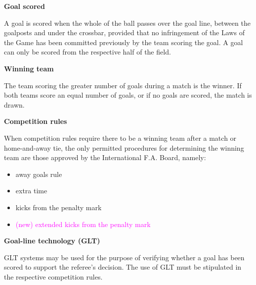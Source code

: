 \clearpage
\sffamily
{\bfseries\color[rgb]{0.4,0.4,0.4}{Law 10 -- The Method of Scoring} }
{}

\bigskip

{\bfseries Goal scored }

\headlinebox

A goal is scored when the whole of the ball passes over the goal line, between the goalposts and under the crossbar, provided that no infringement of the Laws of the Game has been committed previously by the team scoring the goal. A goal can only be scored from the respective half of the field.

\bigskip

{\bfseries Winning team}

\headlinebox

The team scoring the greater number of goals during a match is the winner. If both teams score an equal number of goals, or if no goals are scored, the match is drawn. 

\bigskip

{\bfseries Competition rules }

\headlinebox

When competition rules require there to be a winning team after a match or home-and-away tie, the only permitted procedures for determining the winning team are those approved by the International F.A. Board, namely:

\begin{itemize}
\item away goals rule
\item extra time
\item kicks from the penalty mark
\item \textcolor{magenta}{(new) extended kicks from the penalty mark}
\end{itemize}


{\bfseries Goal-line technology (GLT) }

\headlinebox

GLT systems may be used for the purpose of verifying whether a goal has been scored to support the referee{\textquoteright}s decision. The use of GLT must be stipulated in the respective competition rules.